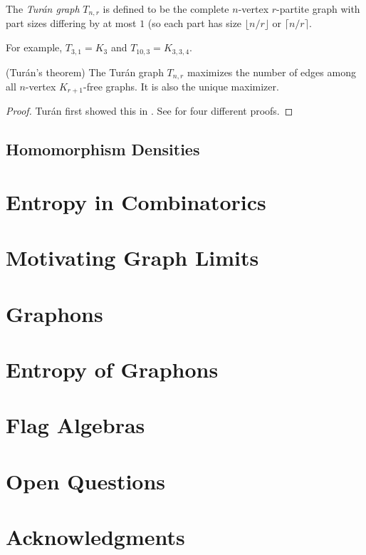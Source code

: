 \documentclass[11pt]{article}
\begin{document}
\begin{definition} The \emph{Turán graph} $T_{n, r}$ is defined to be the complete $n$-vertex $r$-partite graph with part sizes differing by at most $1$ (so each part has size $\lfloor n/ r \rfloor$ or $\lceil n / r \rceil$.
\end{definition}

For example, $T_{3, 1} = K_3$ and $T_{10, 3} = K_{3, 3, 4}$.

\begin{theorem} (Turán's theorem) The Turán graph $T_{n, r}$ maximizes the number of edges among all $n$-vertex $K_{r+1}$-free graphs. It is also the unique maximizer.
\end{theorem}
\begin{proof} Turán first showed this in \cite{turan1941}. See \cite[Theorem~1.2.4]{gtac2023} for four different proofs.
\end{proof}



\subsection{Homomorphism Densities}

\section{Entropy in Combinatorics}

\section{Motivating Graph Limits}

\section{Graphons}

\section{Entropy of Graphons}

\section{Flag Algebras}

\section{Open Questions}

\section*{Acknowledgments}

\printbibliography
\end{document}
